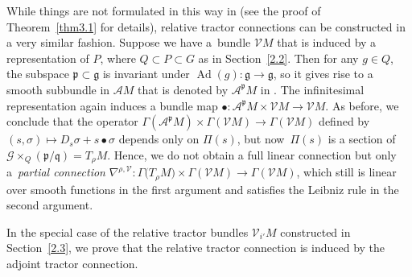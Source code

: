 \documentclass[10pt,a4paper]{amsart}
\numberwithin{equation}{section}
\def\frak{\mathfrak}
\def\Cal{\mathcal}
\newcommand{\x}{\times}
\newcommand{\si}{\sigma}
\newcommand{\Ga}{\Gamma}
\newcommand{\Ad}{\operatorname{Ad}}
\begin{document}
While things are not formulated in this way in \cite{Rel-BGG2} (see the proof of
Theorem~\ref{thm3.1} for details), relative tractor connections can be constructed in
a very similar fashion. Suppose we have a~bundle $\Cal VM$ that is induced by a
representation of $P$, where $Q\subset P\subset G$ as in Section~\ref{2.2}. Then for any
$g\in Q$, the subspace $\frak p\subset\frak g$ is invariant under $\Ad(g)\colon \frak
g\to\frak g$, so it gives rise to a smooth subbundle in $\Cal AM$ that is denoted by
$\Cal A^{\frak p}M$ in \cite{Rel-BGG2}. The infinitesimal representation again
induces a bundle map $\bullet\colon \Cal A^{\frak p}M\x\Cal VM\to\Cal VM$. As before, we
conclude that the operator $\Ga(\Cal A^{\frak p}M)\x\Ga(\Cal VM)\to \Ga(\Cal VM)$
defined by $(s,\si)\mapsto D_s\si+s\bullet\si$ depends only on $\Pi(s)$, but now~$\Pi(s)$ is a section of $\Cal G\x_Q(\frak p/\frak q)=T_\rho M$. Hence, we do not obtain
a full linear connection but only a~\textit{partial connection} $\nabla^{\rho,\Cal V}\colon
\Ga\bigl(T_\rho M\bigr)\x\Ga(\Cal VM)\to\Ga(\Cal VM)$,
which still is linear over smooth
functions in the first argument and satisfies the Leibniz rule in the second
argument.

In the special case of the relative tractor bundles $\Cal V_{i'}M$ constructed in Section~\ref{2.3}, we prove that the relative tractor connection is induced by the adjoint
tractor connection.
\end{document}

